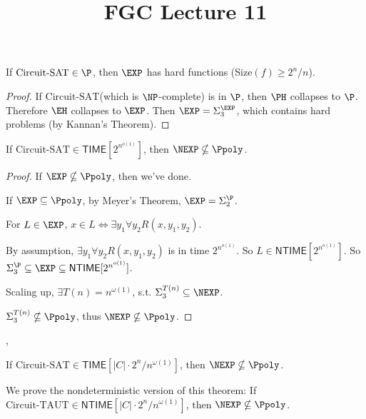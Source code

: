 \documentclass[letterpaper, 12pt]{article}
\newcommand{\Time}[1]{\mathsf{TIME}[#1]}
\newcommand{\NTime}[1]{\mathsf{NTIME}[#1]}
\newcommand{\subexp}{2^{n^{o(1)}}}
\newcommand{\csat}{\textrm{Circuit-SAT}}
\newcommand{\ctaut}{\textrm{Circuit-TAUT}}
\begin{document}
	\title{FGC Lecture 11}
	\date{}
	\maketitle
	
\begin{theorem}
	If $\csat \in \P$, then $\EXP$ has hard functions (Size$(f) \geq 2^n /n$).
\end{theorem}

\begin{proof}
	If $\csat$(which is $\NP$-complete) is in $\P$, then $\PH$ collapses to $\P$. Therefore $\EH$ collapses to $\EXP$. Then $\EXP = \Sigma_3^\EXP$, which contains hard problems (by Kannan's Theorem).
\end{proof}

\begin{theorem}
	If $\csat \in \Time{\subexp}$, then $\NEXP \nsubseteq \Ppoly$.
\end{theorem}
\begin{proof}
	If $\EXP \nsubseteq \Ppoly$, then we've done.
	
	If $\EXP \subseteq \Ppoly$, by Meyer's Theorem, $\EXP = \Sigma_2^\P$.
	
	For $L \in \EXP$, $x \in L \Leftrightarrow \exists y_1 \forall y_2 R(x, y_1, y_2)$.
	
	By assumption, $\exists y_1 \forall y_2 R(x, y_1, y_2)$ is in time $\subexp$. So $L \in \NTime{\subexp}$. So $\Sigma_3^\P \subseteq \EXP \subseteq \NTime{\subexp}$.
	
	Scaling up, $\exists T(n) = n^{\omega(1)}$, s.t. $\Sigma_3^{T(n)} \subseteq \NEXP$.
	
	$\Sigma_3^{T(n)} \nsubseteq \Ppoly$, thus $\NEXP \nsubseteq \Ppoly$.
\end{proof}

\sep

\begin{theorem}[Williams]
	If $\csat \in \Time{|C|\cdot 2^n / n^{\omega(1)}}$, then $\NEXP \nsubseteq \Ppoly$.
\end{theorem}

We prove the nondeterministic version of this theorem: If $\ctaut \in \NTime{|C|\cdot 2^n / n^{\omega(1)}}$, then $\NEXP \nsubseteq \Ppoly$.
\end{document}
